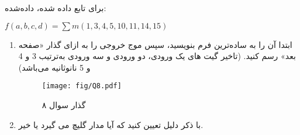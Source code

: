 برای تابع داده شده، داده‌شده:

\begin{latin}
	$f(a,b,c,d)=\sum m(1,3,4,5,10,11,14,15)$
\end{latin}


\begin{enumerate}
	\item
	ابتدا آن را به ساده‌ترین فرم  بنویسید، سپس موج خروجی را به ازای گذار «صفحه بعد» رسم کنید. (تاخیر گیت های یک ورودی، دو ورودی و سه ورودی به‌ترتیب 3 و 4 و 5 نانوثانیه می‌باشد)
	
	
	\begin{figure}[h]
		\centering
		\texttt{[image: fig/Q8.pdf]}
		\label{fig:Q8}
		\caption{گذار سوال ۸}
	\end{figure}
	
	
	
	
	\item 
	با ذکر دلیل تعیین کنید که آیا مدار گلیچ می گیرد یا خیر. 
\end{enumerate}